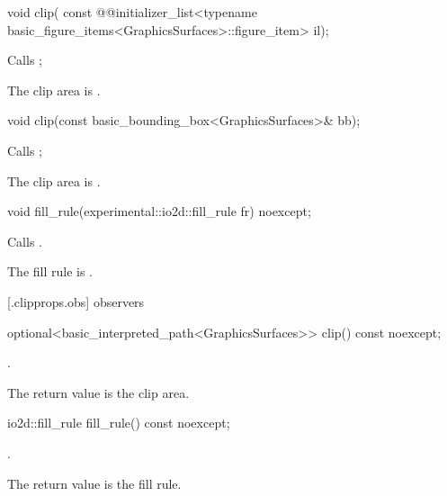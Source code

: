 %
\begin{itemdecl}
void clip(
  const @\stdqualifier{}@initializer_list<typename 
  basic_figure_items<GraphicsSurfaces>::figure_item> il);
\end{itemdecl}
\begin{itemdescr}
\pnum
\effects
Calls ;

\pnum
\remarks
The clip area is .
\end{itemdescr}

%
\begin{itemdecl}
void clip(const basic_bounding_box<GraphicsSurfaces>& bb);
\end{itemdecl}
\begin{itemdescr}
\pnum
\effects
Calls ;

\pnum
\remarks
The clip area is .
\end{itemdescr}

%
\begin{itemdecl}
void fill_rule(experimental::io2d::fill_rule fr) noexcept;
\end{itemdecl}
\begin{itemdescr}
\pnum
\effects
Calls .

\pnum
\remarks
The fill rule is .
\end{itemdescr}

 [\iotwod.clipprops.obs] { observers}

%
\begin{itemdecl}
optional<basic_interpreted_path<GraphicsSurfaces>> clip() const noexcept;
\end{itemdecl}
\begin{itemdescr}
\pnum
\returns
{}.

\pnum
\remarks
The return value is the clip area.
\end{itemdescr}

%
\begin{itemdecl}
io2d::fill_rule fill_rule() const noexcept;
\end{itemdecl}
\begin{itemdescr}
\pnum
\returns
{}.

\pnum
\remarks
The return value is the fill rule.
\end{itemdescr}
